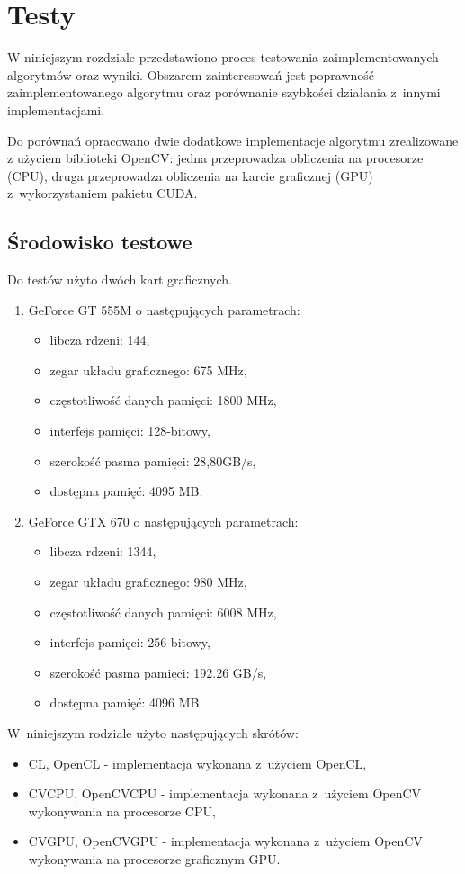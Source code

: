\chapter{Testy}
\label{cha:testy}

W niniejszym rozdziale przedstawiono proces testowania zaimplementowanych algorytmów oraz wyniki. Obszarem zainteresowań jest poprawność zaimplementowanego algorytmu oraz porównanie szybkości działania z~innymi implementacjami.

Do porównań opracowano dwie dodatkowe implementacje algorytmu zrealizowane z użyciem biblioteki OpenCV: jedna przeprowadza obliczenia na procesorze (CPU), druga przeprowadza obliczenia na karcie graficznej (GPU) z~wykorzystaniem pakietu CUDA.

\section{Środowisko testowe}
\label{sec:srodowiskoTesty}

Do testów użyto dwóch kart graficznych.

\begin{enumerate}
\item GeForce GT 555M \cite{GT555M} o następujących parametrach:
\begin{itemize}
\item libcza rdzeni: 144,
\item zegar układu graficznego: 675 MHz,
\item częstotliwość danych pamięci: 1800 MHz,
\item interfejs pamięci: 128-bitowy,
\item szerokość pasma pamięci: 28,80GB/s,
\item dostępna pamięć: 4095 MB.
\end{itemize}

\item GeForce GTX 670 \cite{GTX670} o następujących parametrach:
\begin{itemize}
\item libcza rdzeni: 1344,
\item zegar układu graficznego: 980 MHz,
\item częstotliwość danych pamięci: 6008 MHz,
\item interfejs pamięci: 256-bitowy,
\item szerokość pasma pamięci: 192.26 GB/s,
\item dostępna pamięć: 4096 MB.
\end{itemize}
\end{enumerate}

W~niniejszym rodziale użyto następujących skrótów:
\begin{itemize}
\item CL, OpenCL - implementacja wykonana z~użyciem OpenCL,
\item CVCPU, OpenCVCPU - implementacja wykonana z~użyciem OpenCV wykonywania na procesorze CPU,
\item CVGPU, OpenCVGPU - implementacja wykonana z~użyciem OpenCV wykonywania na procesorze graficznym GPU.
\end{itemize}
